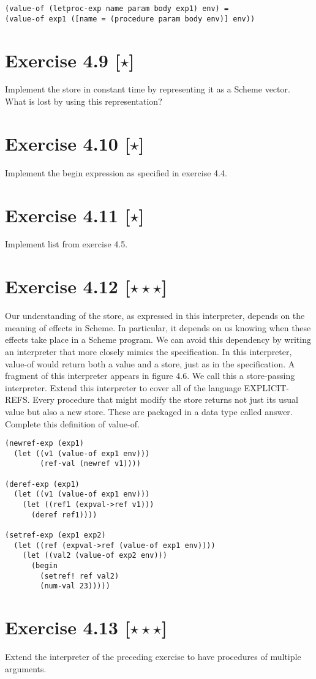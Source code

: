 \documentclass[11pt]{article}
\begin{document}
\begin{lstlisting}
(value-of (letproc-exp name param body exp1) env) =
(value-of exp1 ([name = (procedure param body env)] env))
\end{lstlisting}

\section*{Exercise 4.9 [$\star$]}
Implement the store in constant time by representing it as a Scheme
vector. What is lost by using this representation?

\section*{Exercise 4.10 [$\star$]}
Implement the begin expression as speciﬁed in exercise 4.4.

\section*{Exercise 4.11 [$\star$]}
Implement list from exercise 4.5.

\section*{Exercise 4.12 [$\star \star \star$]}
Our understanding of the store, as expressed in this interpreter,
depends on the meaning of effects in Scheme. In particular, it depends on us knowing
when these effects take place in a Scheme program. We can avoid this dependency by
writing an interpreter that more closely mimics the speciﬁcation. In this interpreter,
value-of would return both a value and a store, just as in the speciﬁcation. A fragment of this interpreter appears in ﬁgure 4.6. We call this a store-passing interpreter.
Extend this interpreter to cover all of the language EXPLICIT-REFS.
Every procedure that might modify the store returns not just its usual value but also a
new store. These are packaged in a data type called answer. Complete this deﬁnition
of value-of.

\begin{lstlisting}
(newref-exp (exp1)
  (let ((v1 (value-of exp1 env)))
        (ref-val (newref v1))))
        
(deref-exp (exp1)
  (let ((v1 (value-of exp1 env)))
    (let ((ref1 (expval->ref v1)))
      (deref ref1))))
      
(setref-exp (exp1 exp2)
  (let ((ref (expval->ref (value-of exp1 env))))
    (let ((val2 (value-of exp2 env)))
      (begin
        (setref! ref val2)
        (num-val 23)))))
\end{lstlisting}

\section*{Exercise 4.13 [$\star \star \star$]}
Extend the interpreter of the preceding exercise to have procedures of multiple arguments.
\end{document}
